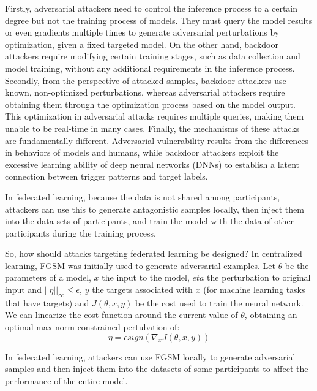 \documentclass[conference]{IEEEtran}
\begin{document}
Firstly, adversarial attackers need to control the inference process to a certain degree
but not the training process of models. They must query the model results or even gradients multiple
times to generate adversarial perturbations by optimization, given a fixed targeted model.
On the other hand, backdoor attackers require modifying certain training stages,
such as data collection and model training, without any additional requirements in the inference process.
Secondly, from the perspective of attacked samples, backdoor attackers use known,
non-optimized perturbations, whereas adversarial attackers require obtaining
them through the optimization process based on the model output.
This optimization in adversarial attacks requires multiple queries,
making them unable to be real-time in many cases.
Finally, the mechanisms of these attacks are fundamentally different.
Adversarial vulnerability results from the differences in behaviors of models and humans,
while backdoor attackers exploit the excessive learning ability of deep neural networks (DNNs)
to establish a latent connection between trigger patterns and target labels.

In federated learning, because the data is not shared among participants,
attackers can use this to generate antagonistic samples locally,
then inject them into the data sets of participants, and train
the model with the data of other participants during the training process.

So, how should attacks targeting federated learning be designed?
In centralized learning, FGSM\cite{b99} was initially used to generate adversarial examples.
Let $\theta$ be the parameters of a model, $x$ the input to the model,
$eta$ the perturbation to original input and $||\eta||_\infty \le \epsilon$,
$y$ the targets associated with $x$ (for machine learning tasks that have targets)
and $J(\theta, x, y)$ be the cost used to train the neural network.
We can linearize the cost function around the current value of $\theta$,
obtaining an optimal max-norm constrained pertubation of:
\begin{equation}
    \eta = \epsilon sign(\nabla_x J(\theta,x,y))
\end{equation}

In federated learning, attackers can use FGSM locally to generate
adversarial samples and then inject them into the datasets of some participants
to affect the performance of the entire model.
\end{document}
